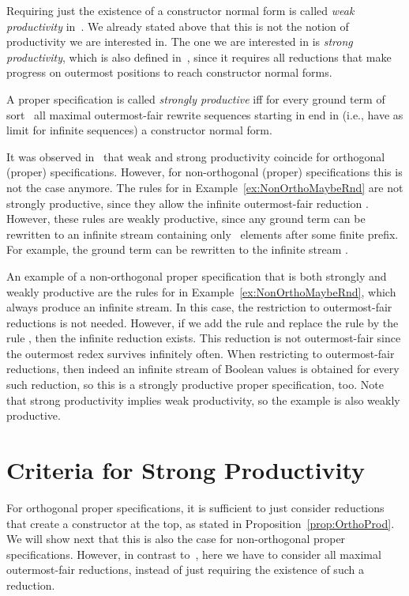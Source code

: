 \documentclass{eptcs}
\begin{document}
Requiring just the existence of a constructor normal form is called
\emph{weak productivity} in~\cite{EGH09,End10}. We already stated above that
this is not the notion of productivity we are interested in. The one we are
interested in is \emph{strong productivity}, which is also defined
in~\cite{EGH09,End10}, since it requires all reductions that make progress on
outermost positions to reach constructor normal forms.

\begin{definition}
\label{def:StrongProd}
A proper specification  is called \emph{strongly productive} iff for
every ground term  of sort~ all maximal outermost-fair rewrite sequences
starting in  end in (i.e., have as limit for infinite sequences)
a constructor normal form.
\end{definition}

It was observed in~\cite{EGH09,End10} that weak and strong productivity coincide
for orthogonal (proper) specifications.
However, for non-orthogonal (proper) specifications this is not the case
anymore.
The rules for  in Example~\ref{ex:NonOrthoMaybeRnd} are not
strongly productive, since they allow the infinite outermost-fair reduction
. However, these rules are weakly
productive, since any ground term can be rewritten to an infinite stream
containing only ~elements after some finite prefix.
For example, the ground term  can be rewritten to the
infinite stream .

An example of a non-orthogonal proper specification that is both strongly and
weakly productive are the rules for  in
Example~\ref{ex:NonOrthoMaybeRnd}, which always produce an infinite stream.
In this case, the restriction to outermost-fair reductions is not needed.
However, if we add the rule  and replace the
rule  by the rule
, then
the infinite reduction
 exists. This
reduction is not outermost-fair since the outermost redex 
survives infinitely often.
When restricting to outermost-fair reductions, then indeed an infinite stream of
Boolean values is obtained for every such reduction, so this is a strongly
productive proper specification, too.
Note that strong productivity implies weak productivity, so the example is also
weakly productive.



\section{Criteria for Strong Productivity}
\label{sec:Criteria}

For orthogonal proper specifications, it is sufficient to just consider
reductions that create a constructor at the top, as stated in
Proposition~\ref{prop:OrthoProd}. We will show next that this is also the case
for non-orthogonal proper specifications. However, in contrast to~\cite{ZR10},
here we have to consider all maximal outermost-fair reductions, instead of just
requiring the existence of such a reduction.
\end{document}

